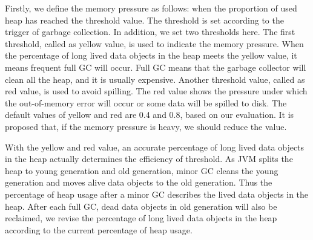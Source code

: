 Firstly, we define the memory pressure as follows: when the proportion of used heap has reached the threshold value. The threshold is set according to the trigger of garbage collection. In addition, we set two thresholds here. The first threshold, called as yellow value, is used to indicate the memory pressure. When the percentage of long lived data objects in the heap meets the yellow value, it means frequent full GC will occur. Full GC means that the garbage collector will clean all the heap, and it is usually expensive. Another threshold value, called as red value, is used to avoid spilling. The red value shows the pressure under which the out-of-memory error will occur or some data will be spilled to disk. The default values of yellow and red are 0.4 and 0.8, based on our evaluation. It is proposed that, if the memory pressure is heavy, we should reduce the value.

With the yellow and red value, an accurate percentage of long lived data objects in the heap actually determines the efficiency of threshold. As JVM splits the heap to young generation and old generation, minor GC cleans the young generation and moves alive data objects to the old generation. Thus the percentage of heap usage after a minor GC describes the lived data objects in the heap. After each full GC, dead data objects in old generation will also be reclaimed, we revise the percentage of long lived data objects in the heap according to the current percentage of heap usage.



